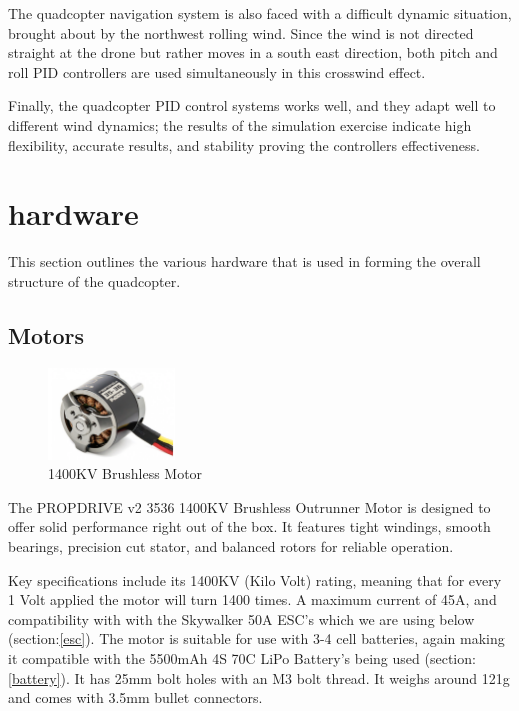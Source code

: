 \documentclass{article}
\begin{document}
The quadcopter navigation system is also faced with a difficult dynamic
situation, brought about by the northwest rolling wind. Since the wind is not
directed straight at the drone but rather moves in a south east direction, both
pitch and roll PID controllers are used simultaneously in this crosswind effect. 

Finally, the quadcopter PID control systems works well, and they adapt well to
different wind dynamics; the results of the simulation exercise indicate high
flexibility, accurate results, and stability proving the controllers
effectiveness. 

\section{hardware}\label{hardware} This section outlines the various hardware
that is used in forming the overall structure of the quadcopter.

\subsection{Motors}\label{motors}
\begin{figure}[H]
  \centering
  \includegraphics[width=0.3\textwidth]{Pictures/motors.png} 
  \caption{1400KV Brushless Motor}
  \label{fig:motor}
\end{figure}
The PROPDRIVE v2 3536 1400KV Brushless Outrunner Motor is designed to offer
solid performance right out of the box. It features tight windings, smooth
bearings, precision cut stator, and balanced rotors for reliable operation.

Key specifications include its 1400KV (Kilo Volt) rating, meaning that for every
1 Volt applied the motor will turn 1400 times. A maximum current of 45A, and
compatibility with with the Skywalker 50A ESC's which we are using below
(section:\ref{esc}). The motor is suitable for use with 3-4 cell batteries,
again making it compatible with the 5500mAh 4S 70C LiPo Battery's being used
(section:\ref{battery}). It has 25mm bolt holes with an M3 bolt thread. It
weighs around 121g and comes with 3.5mm bullet connectors.
\end{document}
